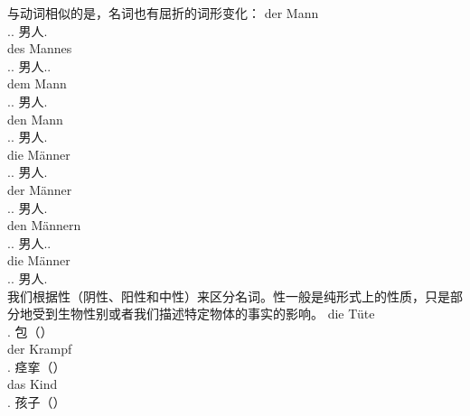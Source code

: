 与动词相似的是，名词也有屈折的词形变化：
\eal
\ex 
\gll der                 Mann\\
     .\nom.\sg{} 男人.\sg\\
\ex 
\gll des                 Mannes\\
     .\gen.\sg{} 男人.\gen.\sg\\
\ex 
\gll dem                 Mann\\
     .\dat.\sg{} 男人.\sg\\
\ex 
\gll den                 Mann\\
   .\acc.\sg{} 男人.\sg\\
\ex 
\gll die                     Männer\\
     .\nom.\pl{} 男人.\pl\\
\ex 
\gll der                     Männer\\
     .\gen.\pl{} 男人.\pl\\
\ex 
\gll den                     Männern\\
     .\dat.\pl{} 男人.\dat.\pl\\
\ex 
\gll die                     Männer\\
     .\acc.\pl{} 男人.\pl\\
\zl
我们根据性（阴性、阳性和中性）来区分名词。性一般是纯形式上的性质，只是部分地受到生物性别或者我们描述特定物体的事实的影响。
\eal
\ex
\gll die Tüte\\
	 .\fem{} 包（\fem）\\
\ex 
\gll der Krampf\\
	 .\mas{} 痉挛（\mas）\\
\ex 
\gll das Kind\\
	 .\neu{} 孩子（\neu）\\
\zl

